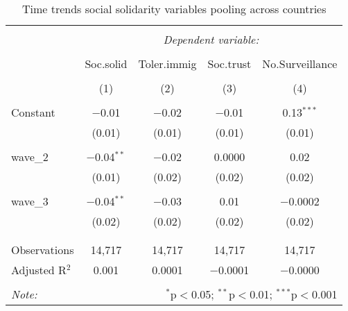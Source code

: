 
\begin{table}[!htbp] \centering 
  \caption{Time trends social solidarity variables pooling across countries} 
  \label{tab:reg_sol_1} 
\begin{tabular}{@{\extracolsep{5pt}}lcccc} 
\\[-1.8ex]\hline 
\hline \\[-1.8ex] 
 & \multicolumn{4}{c}{\textit{Dependent variable:}} \\ 
\cline{2-5} 
\\[-1.8ex] & Soc.solid & Toler.immig & Soc.trust & No.Surveillance \\ 
\\[-1.8ex] & (1) & (2) & (3) & (4)\\ 
\hline \\[-1.8ex] 
 Constant & $-$0.01 & $-$0.02 & $-$0.01 & 0.13$^{***}$ \\ 
  & (0.01) & (0.01) & (0.01) & (0.01) \\ 
  & & & & \\ 
 wave\_2 & $-$0.04$^{**}$ & $-$0.02 & 0.0000 & 0.02 \\ 
  & (0.01) & (0.02) & (0.02) & (0.02) \\ 
  & & & & \\ 
 wave\_3 & $-$0.04$^{**}$ & $-$0.03 & 0.01 & $-$0.0002 \\ 
  & (0.02) & (0.02) & (0.02) & (0.02) \\ 
  & & & & \\ 
\hline \\[-1.8ex] 
Observations & 14,717 & 14,717 & 14,717 & 14,717 \\ 
Adjusted R$^{2}$ & 0.001 & 0.0001 & $-$0.0001 & $-$0.0000 \\ 
\hline 
\hline \\[-1.8ex] 
\textit{Note:}  & \multicolumn{4}{r}{$^{*}$p$<$0.05; $^{**}$p$<$0.01; $^{***}$p$<$0.001} \\ 
\end{tabular} 
\end{table} 

